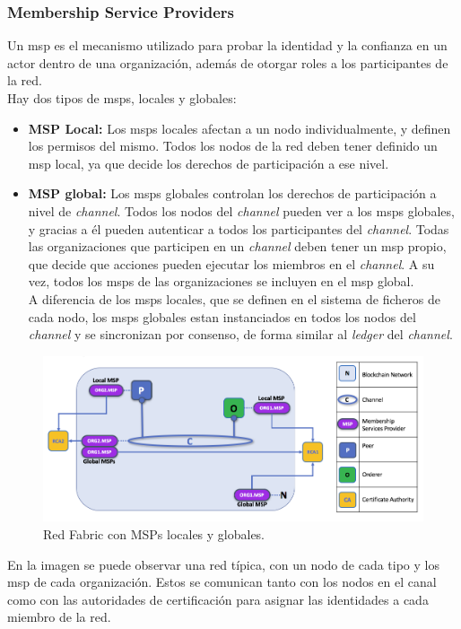 \subsubsection{Membership Service Providers}
Un \acrshort{msp} es el mecanismo utilizado para probar la identidad y la confianza en un actor dentro de una organización, además de otorgar roles a los participantes de la red.\\
Hay dos tipos de \acrshort{msp}s, locales y globales:
\begin{itemize}
    \item \textbf{MSP Local:} Los \acrshort{msp}s locales afectan a un nodo individualmente, y definen los permisos del mismo. Todos los nodos de la red deben tener definido un \acrshort{msp} local, ya que decide los derechos de participación a ese nivel.
    \item \textbf{MSP global:} Los \acrshort{msp}s globales controlan los derechos de participación a nivel de \textit{channel}. Todos los nodos del \textit{channel} pueden ver a los \acrshort{msp}s globales, y gracias a él pueden autenticar a todos los participantes del \textit{channel}. Todas las organizaciones que participen en un \textit{channel} deben tener un \acrshort{msp} propio, que decide que acciones pueden ejecutar los miembros en el \textit{channel}. A su vez, todos los \acrshort{msp}s de las organizaciones se incluyen en el \acrshort{msp} global.\\
    A diferencia de los \acrshort{msp}s locales, que se definen en el sistema de ficheros de cada nodo, los \acrshort{msp}s globales estan instanciados en todos los nodos del \textit{channel} y se sincronizan por consenso, de forma similar al \textit{ledger} del \textit{channel}.
\end{itemize}
\begin{figure}[H]
\centerline{\includegraphics[scale=0.45]{recursos/msp.png}}
\caption{Red Fabric con MSPs locales y globales.}
\label{msps}
\end{figure}
En la imagen se puede observar una red típica, con un nodo de cada tipo y los \acrshort{msp} de cada organización. Estos se comunican tanto con los nodos en el canal como con las autoridades de certificación para asignar las identidades a cada miembro de la red.
\clearpage
